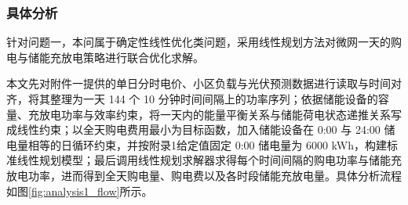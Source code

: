 
\subsubsection{具体分析}

针对问题一，本问属于确定性线性优化类问题，采用线性规划方法对微网一天的购电与储能充放电策略进行联合优化求解。

本文先对附件一提供的单日分时电价、小区负载与光伏预测数据进行读取与时间对齐，将其整理为一天 144 个 10 分钟时间间隔上的功率序列；依据储能设备的容量、充放电功率与效率约束，将一天内的能量平衡关系与储能荷电状态递推关系写成线性约束；以全天购电费用最小为目标函数，加入储能设备在 0:00 与 24:00 储电量相等的日循环约束，并按附录1给定值固定 0:00 储电量为 6000 kWh，构建标准线性规划模型；最后调用线性规划求解器求得每个时间间隔的购电功率与储能充放电功率，进而得到全天购电量、购电费以及各时段储能充放电量。具体分析流程如图\ref{fig:analysis1_flow}所示。

